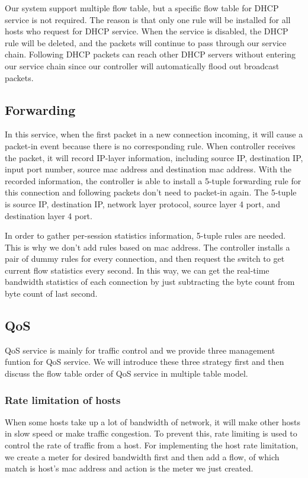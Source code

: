 \documentclass[journal]{IEEEtran}
\begin{document}
Our system support multiple flow table, but a specific flow table for DHCP service is not required.
The reason is that only one rule will be installed for all hosts who request for DHCP service.
When the service is disabled, the DHCP rule will be deleted,
and the packets will continue to pass through our service chain.
Following DHCP packets can reach other DHCP servers without entering our service chain
since our controller will automatically flood out broadcast packets.



\subsection{Forwarding} \label{ssec:forwarding}
In this service, when the first packet in a new connection incoming, it will cause a packet-in event because there is no corresponding rule. When controller receives the packet, it will record IP-layer information, including source IP, destination IP, input port number, source mac address and destination mac address. With the recorded information, the controller is able to install a 5-tuple forwarding rule for this connection and following packets don’t need to packet-in again. The 5-tuple is source IP, destination IP, network layer protocol, source layer 4 port, and destination layer 4 port.

In order to gather per-session statistics information, 5-tuple rules are needed. This is why we don’t add rules  based on mac address.  The controller installs a pair of dummy rules for every connection, and then request the switch to get current flow statistics every second. In this way, we can get the real-time bandwidth statistics of each connection by just subtracting the byte count from byte count of last second.



\subsection{QoS}
QoS service is mainly for traffic control and we provide three management funtion for QoS service. We will introduce these three strategy first and then discuss the flow table order of QoS service in multiple table model.

\subsubsection{Rate limitation of hosts}
When some hosts take up a lot of bandwidth of network, it will make other hosts in slow speed or make traffic congestion. To prevent this, rate limiting is used to control the rate of traffic from a host. For implementing the host rate limitation, we create a meter for desired bandwidth first and then add a flow, of which match is host’s mac address and action is the meter we just created.
\end{document}
